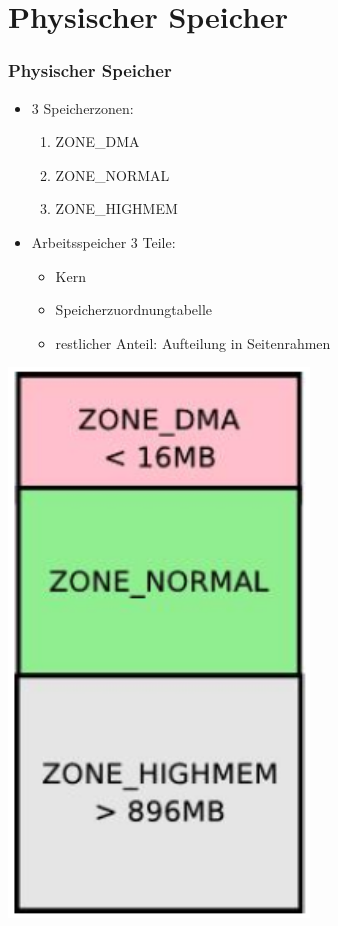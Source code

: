 \documentclass[ddcfooter,nosectionnum]{tudbeamer}
\begin{document}
\section{Physischer Speicher}
\begin{frame}
    \frametitle{Physischer Speicher}   
    
	\begin{minipage}[b]{0.7\textwidth} 
		 	\begin{itemize}
				\item 3 Speicherzonen: 
				\begin{enumerate}	 	
					\item ZONE\_DMA 
					\item ZONE\_NORMAL
					\item ZONE\_HIGHMEM
				\end{enumerate}
				\item Arbeitsspeicher 3 Teile: 
				\begin{itemize}
					\item Kern
					\item Speicherzuordnungtabelle
					\item restlicher Anteil: Aufteilung in Seitenrahmen
				\end{itemize}
			\end{itemize}
	\end{minipage}
%
	\begin{minipage}[t]{0.29\textwidth}
		\includegraphics[width=0.6\textwidth]{zonen.png}
	\end{minipage}
\end{frame}
\end{document}
